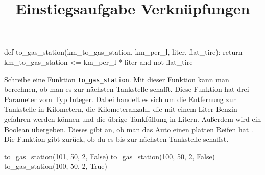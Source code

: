 \documentclass[a4paper, fontsize = 13, DIV = calc]{scrartcl}
\title{Einstiegsaufgabe Verknüpfungen}
\date{}
\newcommand{\expandpyconc}[1]{\expandafter\reallyexpandpyconc\expandafter{#1}}
\newcommand{\reallyexpandpyconc}[1]{\pyconc{exec(compile(open('#1', 'rb').read(), '#1', 'exec'))}}
\newenvironment{pyconcodeblck}[1]
{\newcommand{\snippetfile}{snippet-#1.py}
	\VerbatimEnvironment
	\begin{VerbatimOut}{\snippetfile}}
	{\end{VerbatimOut}
	\expandpyconc{\snippetfile}}
\begin{document}
\begin{pyconcodeblck}{temp}
def to_gas_station(km_to_gas_station, km_per_l, liter, flat_tire):
	return km_to_gas_station <= km_per_l * liter and not flat_tire
\end{pyconcodeblck}





\begin{aufgabe} \noindent 
Schreibe eine Funktion \texttt{to_gas_station}. Mit dieser Funktion kann man berechnen, ob man es zur nächsten Tankstelle schafft. Diese Funktion hat drei Parameter vom Typ Integer. Dabei handelt es sich um die Entfernung zur Tankstelle in Kilometern, die Kilometeranzahl, die mit einem Liter Benzin gefahren werden können und die übrige Tankfüllung in Litern. Außerdem wird ein Boolean übergeben. Dieses gibt an, ob man das Auto einen platten Reifen hat . Die Funktion gibt zurück, ob du es bis zur nächsten Tankstelle schaffst.
\begin{pyconsole}
to_gas_station(101, 50, 2, False)
to_gas_station(100, 50, 2, False)
to_gas_station(100, 50, 2, True)
\end{pyconsole}
\end{aufgabe}



\newpage
\end{document}
